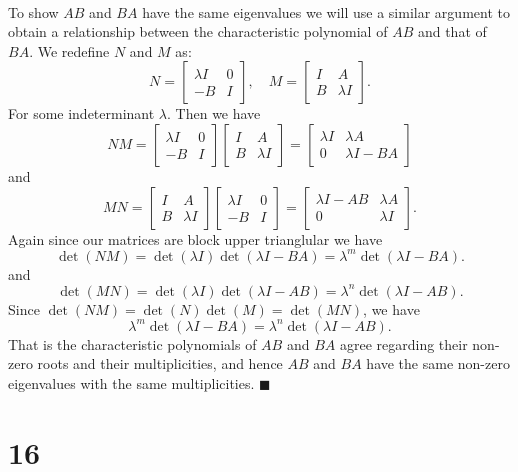 \documentclass[letterpaper,12pt,oneside,onecolumn]{article}
\newcommand{\1}{\mathbbm{1}}
\begin{document}
\paragraph{}
To show $AB$ and $BA$ have the same eigenvalues we will use a similar argument to obtain a relationship between the characteristic polynomial of $AB$ and that of $BA$. We redefine $N$ and $M$ as:
$$N = \begin{bmatrix} \lambda I & 0 \\-B & I \end{bmatrix}, \quad M = \begin{bmatrix} I & A \\B & \lambda I \end{bmatrix}.$$
For some indeterminant $\lambda$. Then we have
$$NM = \begin{bmatrix} \lambda I & 0 \\-B & I \end{bmatrix}\begin{bmatrix} I & A \\B & \lambda I \end{bmatrix} = \begin{bmatrix}\lambda I & \lambda A \\ 0 & \lambda I-BA\end{bmatrix}$$
and
$$MN = \begin{bmatrix} I & A \\B & \lambda I \end{bmatrix}\begin{bmatrix} \lambda I & 0 \\-B & I \end{bmatrix} = \begin{bmatrix} \lambda I-AB & \lambda A \\ 0 & \lambda I\end{bmatrix}.$$
Again since our matrices are block upper trianglular we have
$$\det(NM) = \det(\lambda I)\det(\lambda I - BA) = \lambda^m \det(\lambda I - BA).$$
and 
$$\det(MN) = \det(\lambda I) \det(\lambda I -AB) = \lambda^n \det(\lambda I - AB).$$
Since $\det(NM) = \det(N)\det(M) = \det(MN)$, we have
$$\lambda^m \det(\lambda I - BA) = \lambda^n \det(\lambda I - AB).$$
That is the characteristic polynomials of $AB$ and $BA$ agree regarding their non-zero roots and their multiplicities, and hence $AB$ and $BA$ have the same non-zero eigenvalues with the same multiplicities. $\blacksquare$
\section*{16}
\end{document}
